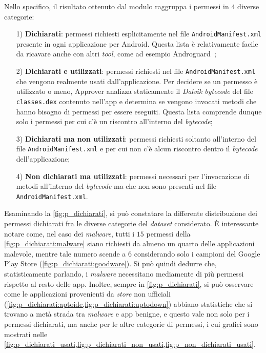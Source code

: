 \documentclass[12pt,a4paper,oneside]{article}
\begin{document}
Nello specifico, il risultato ottenuto dal modulo raggruppa i permessi in $4$ diverse categorie:
\begin{enumerate}
    \item[1)]\textbf{Dichiarati}: permessi richiesti esplicitamente nel file \texttt{AndroidManifest.xml} presente in ogni applicazione per Android. Questa lista è relativamente facile da ricavare anche con altri \textit{tool}, come ad esempio Androguard~\cite{ANDROGUARD};
    \item[2)]\textbf{Dichiarati e utilizzati}: permessi richiesti nel file \texttt{AndroidManifest.xml} che vengono realmente usati dall'applicazione. Per decidere se un permesso è utilizzato o meno, Approver analizza staticamente il \textit{Dalvik bytecode} del file \texttt{classes.dex} contenuto nell'app e determina se vengono invocati metodi che hanno bisogno di permessi per essere eseguiti. Questa lista comprende dunque solo i permessi per cui c'è un riscontro all'interno del \textit{bytecode};
    \item[3)]\textbf{Dichiarati ma non utilizzati}: permessi richiesti soltanto all'interno del file \texttt{AndroidManifest.xml} e per cui non c'è alcun riscontro dentro il \textit{bytecode} dell'applicazione;
    \item[4)]\textbf{Non dichiarati ma utilizzati}: permessi necessari per l'invocazione di metodi all'interno del \textit{bytecode} ma che non sono presenti nel file \texttt{AndroidManifest.xml}.
\end{enumerate}
Esaminando la \cref{fig:p_dichiarati}, si può constatare la differente distribuzione dei permessi dichiarati fra le diverse categorie del \textit{dataset} considerato. È interessante notare come, nel caso dei \textit{malware}, tutti i $15$ permessi della \cref{fig:p_dichiarati:malware} siano richiesti da almeno un quarto delle applicazioni malevole, mentre tale numero scende a $6$ considerando solo i campioni del Google Play Store (\cref{fig:p_dichiarati:goodware}). Si può quindi dedurre che, statisticamente parlando, i \textit{malware} necessitano mediamente di più permessi rispetto al resto delle app. Inoltre, sempre in \cref{fig:p_dichiarati}, si può osservare come le applicazioni provenienti da \textit{store} non ufficiali (\cref{fig:p_dichiarati:aptoide,fig:p_dichiarati:uptodown}) abbiano statistiche che si trovano a metà strada tra \textit{malware} e app benigne, e questo vale non solo per i permessi dichiarati, ma anche per le altre categorie di permessi, i cui grafici sono mostrati nelle \cref{fig:p_dichiarati_usati,fig:p_dichiarati_non_usati,fig:p_non_dichiarati_usati}.
\end{document}
